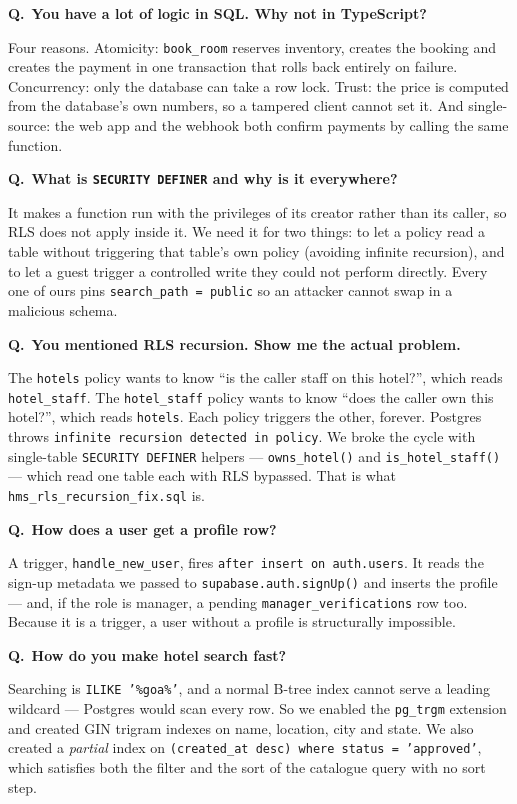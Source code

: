 \documentclass[11pt,a4paper]{article}
\newcommand{\Q}[1]{\vspace{7pt}\noindent\textbf{\color{primary}Q.}~\textbf{#1}\par\vspace{1pt}}
\newcommand{\A}[1]{\noindent #1\par}
\newcommand{\file}[1]{\texttt{\small #1}}
\begin{document}
\Q{You have a lot of logic in SQL. Why not in TypeScript?}
\A{Four reasons. Atomicity: \texttt{book\_room} reserves inventory, creates the
booking and creates the payment in one transaction that rolls back entirely on
failure. Concurrency: only the database can take a row lock. Trust: the price is
computed from the database's own numbers, so a tampered client cannot set it. And
single-source: the web app and the webhook both confirm payments by calling the
same function.}

\Q{What is \texttt{SECURITY DEFINER} and why is it everywhere?}
\A{It makes a function run with the privileges of its creator rather than its
caller, so RLS does not apply inside it. We need it for two things: to let a
policy read a table without triggering that table's own policy (avoiding infinite
recursion), and to let a guest trigger a controlled write they could not perform
directly. Every one of ours pins \texttt{search\_path = public} so an attacker
cannot swap in a malicious schema.}

\Q{You mentioned RLS recursion. Show me the actual problem.}
\A{The \texttt{hotels} policy wants to know ``is the caller staff on this hotel?'',
which reads \texttt{hotel\_staff}. The \texttt{hotel\_staff} policy wants to know
``does the caller own this hotel?'', which reads \texttt{hotels}. Each policy
triggers the other, forever. Postgres throws \texttt{infinite recursion detected
in policy}. We broke the cycle with single-table \texttt{SECURITY DEFINER} helpers
--- \texttt{owns\_hotel()} and \texttt{is\_hotel\_staff()} --- which read one table
each with RLS bypassed. That is what \file{hms\_rls\_recursion\_fix.sql} is.}

\Q{How does a user get a profile row?}
\A{A trigger, \texttt{handle\_new\_user}, fires \texttt{after insert on
auth.users}. It reads the sign-up metadata we passed to
\texttt{supabase.auth.signUp()} and inserts the profile --- and, if the role is
manager, a pending \texttt{manager\_verifications} row too. Because it is a
trigger, a user without a profile is structurally impossible.}

\Q{How do you make hotel search fast?}
\A{Searching is \texttt{ILIKE '\%goa\%'}, and a normal B-tree index cannot serve a
leading wildcard --- Postgres would scan every row. So we enabled the
\texttt{pg\_trgm} extension and created GIN trigram indexes on name, location,
city and state. We also created a \emph{partial} index on
\texttt{(created\_at desc) where status = 'approved'}, which satisfies both the
filter and the sort of the catalogue query with no sort step.}
\end{document}
